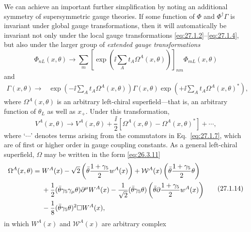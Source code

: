 We can achieve an important further simplification by noting an additional
symmetry of supersymmetric gauge theories. If some function of \(\Phi\)
and \(\Phi^\dagger\Gamma\) is invariant under global gauge transformations,
then it will automatically be invariant not only under the local gauge
transformations \eqref{eq:27.1.2}--\eqref{eq:27.1.4}, but also under the
larger group of \textit{extended gauge transformations}
\begin{equation}
  \Phi_{nL}(x,\theta)\longrightarrow
  \sum_m\left[
    \exp\left(\ii\sum_A t_A\Omega^A(x,\theta)\right)
  \right]_{nm}\Phi_{mL}(x,\theta)
  \tag{27.1.11}\label{eq:27.1.11}
\end{equation}
and
\begin{equation}
  \begin{split}
  \Gamma(x,\theta)\longrightarrow{}&
  \exp\left(-\ii\sum_A t_A\Omega^A(x,\theta)\right)
  \Gamma(x,\theta)
  \exp\left(+\ii\sum_A t_A\Omega^A(x,\theta)^*\right),
  \end{split}
  \tag{27.1.12}\label{eq:27.1.12}
\end{equation}
where \(\Omega^A(x,\theta)\) is an arbitrary left-chiral superfield---that
is, an arbitrary function of \(\theta_L\) as well as \(x_+\). Under this
transformation,
\begin{equation}
  V^A(x,\theta)\longrightarrow
  V^A(x,\theta)
  +\frac{\ii}{2}\left[
    \Omega^A(x,\theta)-\Omega^A(x,\theta)^*
  \right]+\cdots,
  \tag{27.1.13}\label{eq:27.1.13}
\end{equation}
where `\(\cdots\)' denotes terms arising from the commutators in
Eq.~\eqref{eq:27.1.7}, which are of first or higher order in gauge coupling
constants. As a general left-chiral superfield, \(\Omega\) may be written
in the form \eqref{eq:26.3.11}
\begin{equation}
  \begin{aligned}
  \Omega^A(x,\theta)={}&
  W^A(x)
  -\sqrt{2}\left(
    \bar\theta\frac{1+\gamma_5}{2}w^A(x)
  \right)
  +\mathcal{W}^A(x)\left(
    \bar\theta\frac{1+\gamma_5}{2}\theta
  \right)
  \\
  &+\frac12(\bar\theta\gamma_5\gamma_\mu\theta)
    \partial^\mu W^A(x)
  -\frac1{\sqrt{2}}(\bar\theta\gamma_5\theta)
    \left(
      \bar\theta\sl{\partial}\frac{1+\gamma_5}{2}w^A(x)
    \right)
  \\
  &-\frac18(\bar\theta\gamma_5\theta)^2\Box W^A(x),
  \end{aligned}
  \tag{27.1.14}\label{eq:27.1.14}
\end{equation}
in which \(W^A(x)\) and \(\mathcal{W}^A(x)\) are arbitrary complex
